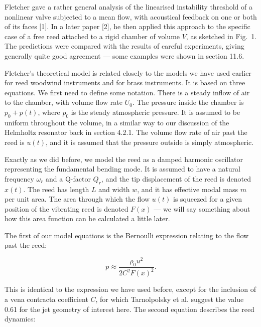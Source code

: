   Fletcher gave a rather general analysis of the linearised instability 
  threshold of a nonlinear valve subjected to a mean flow, with acoustical 
  feedback on one or both of its faces [1]. In a later paper [2], he then 
  applied this approach to the specific case of a free reed attached to a rigid 
  chamber of volume $V$, as sketched in Fig.\ 1. The predictions were compared 
  with the results of careful experiments, giving generally quite good 
  agreement --- some examples were shown in section 11.6. 


  Fletcher's theoretical model is related closely to the models we have used 
  earlier for reed woodwind instruments and for brass instruments. It is based 
  on three equations. We first need to define some notation. There is a steady 
  inflow of air to the chamber, with volume flow rate $U_0$. The pressure 
  inside the chamber is $p_0+p(t)$, where $p_0$ is the steady atmospheric 
  pressure. It is assumed to be uniform throughout the volume, in a similar way 
  to our discussion of the Helmholtz resonator back in section 4.2.1. The 
  volume flow rate of air past the reed is $u(t)$, and it is assumed that the 
  pressure outside is simply atmospheric. 

  Exactly as we did before, we model the reed as a damped harmonic oscillator 
  representing the fundamental bending mode. It is assumed to have a natural 
  frequency $\omega_r$ and a Q-factor $Q_r$, and the tip displacement of the 
  reed is denoted $x(t)$. The reed has length $L$ and width $w$, and it has 
  effective modal mass $m$ per unit area. The area through which the flow 
  $u(t)$ is squeezed for a given position of the vibrating reed is denoted 
  $F(x)$ --- we will say something about how this area function can be 
  calculated a little later. 

  The first of our model equations is the Bernoulli expression relating to the 
  flow past the reed: 

  $$p \approx \dfrac{\rho_0 u^2}{2 C^2 F(x)^2} . \tag{1}$$ 

  This is identical to the expression we have used before, except for the 
  inclusion of a vena contracta coefficient $C$, for which Tarnolpolsky et al. 
  suggest the value 0.61 for the jet geometry of interest here. The second 
  equation describes the reed dynamics: 

